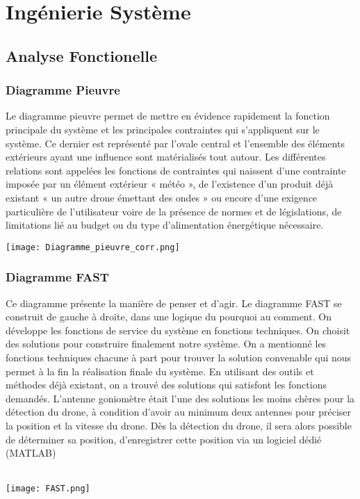 \chapter{Ingénierie Système}

\section{Analyse Fonctionelle}

\subsection{Diagramme Pieuvre}

Le diagramme pieuvre permet de mettre en évidence rapidement la fonction principale du système et les principales contraintes qui s'appliquent sur le système. Ce dernier est représenté par l'ovale central et l'ensemble des éléments extérieurs ayant une influence sont matérialisés tout autour. Les différentes relations sont appelées les fonctions de contraintes qui naissent d'une contrainte imposée par un élément extérieur « météo », de l'existence d'un produit déjà existant « un autre drone émettant des ondes » ou encore d'une exigence particulière de l'utilisateur voire de la présence de normes et de législations, de limitations lié au budget ou du type d'alimentation énergétique nécessaire.


\texttt{[image: Diagramme\_pieuvre\_corr.png]}


\subsection{Diagramme FAST}

Ce diagramme  présente la  manière de penser et d'agir. Le diagramme FAST se construit de gauche à droite, dans une logique du pourquoi au comment. On développe les fonctions de service du système en fonctions techniques. On choisit des solutions pour construire finalement notre système. On a mentionné les fonctions techniques chacune  à part pour trouver la solution convenable qui nous permet à la fin la réalisation finale du système. En utilisant des outils et méthodes déjà existant, on a trouvé des solutions qui satisfont les fonctions demandés.
L’antenne goniomètre était l’une des solutions les moins chères pour la détection du drone, à condition d’avoir au minimum deux antennes pour préciser la position et la vitesse du drone. Dès la détection du drone, il sera alors possible de déterminer sa position, d'enregistrer cette position via un logiciel dédié (MATLAB)

~\\

\texttt{[image: FAST.png]}
\parindent=15pt





